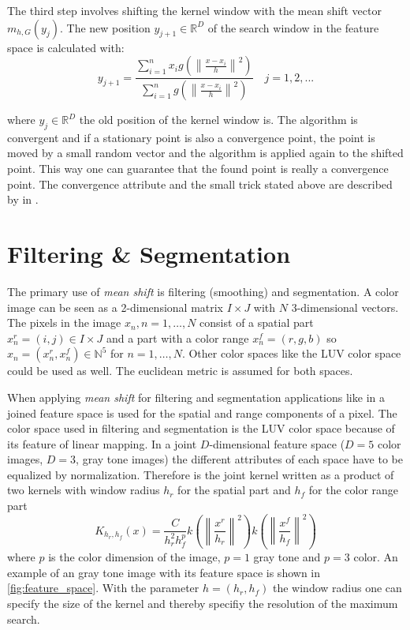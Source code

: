 The third step involves shifting the kernel window with the mean shift
vector $m_{h,G}(y_j)$. The new position $y_{j+1} \in \mathbb{R}^D$ of
the search window in the feature space is calculated with:
\begin{equation}\label{eq:msproc}
  y_{j+1} = 
  \frac{\sum_{i=1}^n x_i g\left(\left\lVert \frac{x - x_i}{h}
      \right\rVert^2\right)}{\sum_{i=1}^n g\left(\left\lVert \frac{x - x_i}{h}
      \right\rVert^2\right)} \quad j = 1,2,...
\end{equation}


where $y_j \in \mathbb{R}^D$ the old position of the kernel window
is. The algorithm is convergent and if a stationary point is also a
convergence point, the point is moved by a small random vector and the
algorithm is applied again to the shifted point. This way one can
guarantee that the found point is really a convergence point. The
convergence attribute and the small trick stated above are described
by \citeauthor{citeulike:462300} in \citep{citeulike:462300}.


\section{Filtering {\upshape\&} Segmentation} %
\label{sec:filtering_segmentation}
The primary use of \emph{mean shift} is filtering (smoothing) and
segmentation.  A color image can be seen as a 2-dimensional matrix $I
\times J$ with $N$ 3-dimensional vectors. The pixels in the image
$x_n, n = 1, \ldots , N$ consist of a spatial part $x_n^r = (i,j) \in
I \times J$ and a part with a color range $x_n^f = (r,g,b)$ so $x_n =
(x_n^r, x_n^f) \in \mathbb{N}^5$ for $n = 1, \ldots , N$.  Other color
spaces like the \gls{LUV} color space could be used as well. The
euclidean metric is assumed for both spaces.

When applying \emph{mean shift} for filtering and segmentation
applications like in \citeauthor{citeulike:462300}
\citep{citeulike:462300} a joined feature space is used for the
spatial and range components of a pixel. The color space used in
filtering and segmentation is the \gls{LUV} color space because of its
feature of linear mapping. In a joint $D$-dimensional feature space
($D=5$ color images, $D=3$, gray tone images) the different attributes
of each space have to be equalized by normalization. Therefore is the
joint kernel written as a product of two kernels with window radius
$h_r$ for the spatial part and $h_f$ for the color range part
\begin{equation}\label{eq:jokernel}
  K_{h_r, h_f}(x) = \frac{C}{h_r^2h_f^p}
  k \left( \left\lVert \frac{x^r}{h_r} \right\rVert^2\right) 
  k \left( \left\lVert \frac{x^f}{h_f} \right\rVert^2\right) 
\end{equation}
where $p$ is the color dimension of the image, $p=1$ gray tone and
$p=3$ color.  An example of an gray tone image with its feature space
is shown in \autoref{fig:feature_space}. With the parameter $h = (h_r,
h_f)$ the window radius one can specify the size of the kernel and
thereby specifiy the resolution of the maximum search.

